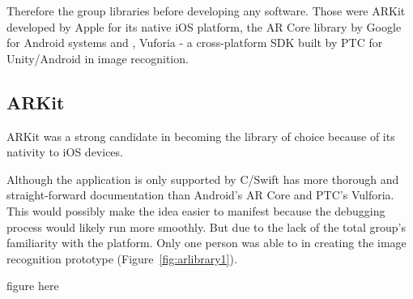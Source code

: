   Therefore the group   libraries before developing any software. Those were\change{;}{,}   ARKit developed by Apple for its native iOS platform, the AR Core library by Google for Android systems and , Vuforia - a cross-platform SDK built by PTC for Unity/Android   in image recognition.

\subsection{ARKit}
ARKit was a strong candidate in becoming the  library of choice because of its nativity to iOS devices. 

Although the application is only supported by C/Swift  has more thorough and straight-forward documentation than Android's AR Core and PTC's Vulforia. This would possibly make the idea easier to manifest because the debugging process would likely run more smoothly. But due to the lack of the total group's familiarity with the platform. Only one person was able to  in creating the image recognition prototype (Figure~\ref{fig:arlibrary1}). 

figure here

